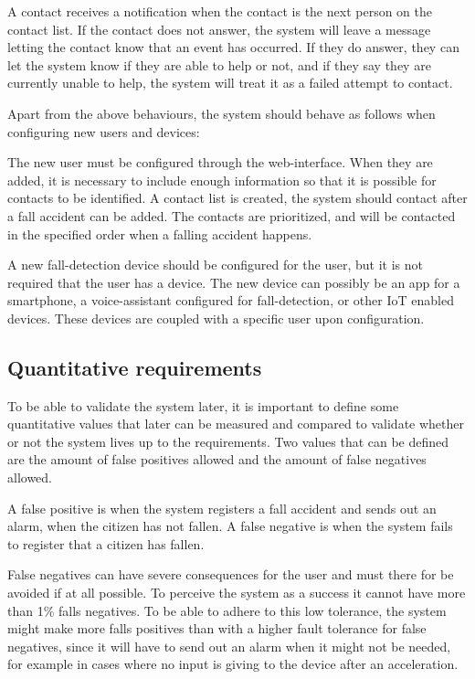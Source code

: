 A contact receives a notification when the contact is the next person on the contact list. If the contact does not answer, the system will leave a message letting the contact know that an event has occurred. If they do answer, they can let the system know if they are able to help or not, and if they say they are currently unable to help, the system will treat it as a failed attempt to contact.

Apart from the above behaviours, the system should behave as follows when configuring new users and devices:

The new user must be configured through the web-interface. When they are added, it is necessary to include enough information so that it is possible for contacts to be identified. A contact list is created, the system should contact after a fall accident can be added. The contacts are prioritized, and will be contacted in the specified order when a falling accident happens. 

A new fall-detection device should be configured for the user, but it is not required that the user has a device.
The new device can possibly be an app for a smartphone, a voice-assistant configured for fall-detection, or other IoT enabled devices. These devices are coupled with a specific user upon configuration.

\subsection{Quantitative requirements}
To be able to validate the system later, it is important to define some quantitative values that later can be measured and compared to validate whether or not the system lives up to the requirements. Two values that can be defined are the amount of false positives allowed and the amount of false negatives allowed. 

A false positive is when the system registers a fall accident and sends out an alarm, when the citizen has not fallen. A false negative is when the system fails to register that a citizen has fallen.

False negatives can have severe consequences for the user and must there for be avoided if at all possible. To perceive the system as a success it cannot have more than 1\% falls negatives. To be able to adhere to this low tolerance, the system might make more falls positives than with a higher fault tolerance for false negatives, since it will have to send out an alarm when it might not be needed, for example in cases where no input is giving to the device after an acceleration.

